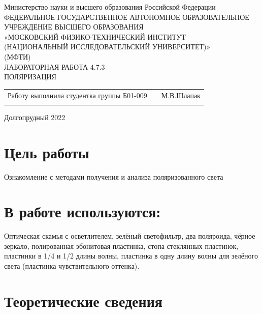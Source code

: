 \documentclass[a4paper]{article}
\begin{document}
 
 \begin{titlepage}
\begin{center}
\hfill \break
Министерство науки и высшего образования Российской Федерации\\
ФЕДЕРАЛЬНОЕ ГОСУДАРСТВЕННОЕ АВТОНОМНОЕ ОБРАЗОВАТЕЛЬНОЕ\\ 
УЧРЕЖДЕНИЕ ВЫСШЕГО ОБРАЗОВАНИЯ\\ 
«МОСКОВСКИЙ ФИЗИКО-ТЕХНИЧЕСКИЙ ИНСТИТУТ\\ 
(НАЦИОНАЛЬНЫЙ ИССЛЕДОВАТЕЛЬСКИЙ УНИВЕРСИТЕТ)»\\
(МФТИ)\\
\hfill \break
\hfill \break
\hfill \break
\hfill \break
\hfill \break
\hfill \break
\hfill \break
\hfill \break
\hfill \break
\hfill \break
\hfill \break
ЛАБОРАТОРНАЯ РАБОТА 4.7.3\\
\hfill \break
ПОЛЯРИЗАЦИЯ\\
\end{center}
\hfill \break
\hfill \break
\hfill \break
\hfill \break
\hfill \break
\hfill \break
\hfill \break
\hfill \break
\hfill \break
\hfill \break
\begin{tabular}{ccc}
Работу выполнила студентка группы Б01-009 & & М.В.Шлапак \\\\
\end{tabular}
\hfill \break
\hfill \break
\hfill \break
\hfill \break
\hfill \break
\hfill \break
\hfill \break
\hfill \break
\begin{center} Долгопрудный 2022 \end{center}
\end{titlepage}
\small
{}
\tableofcontents    
\newpage
\section{Цель работы}
Ознакомление с методами получения и анализа поляризованного света\\
\section{В работе используются:}
Оптическая скамья с осветлителем, зелёный светофильтр, два поляроида, чёрное зеркало, полированная эбонитовая пластинка, стопа стеклянных пластинок, пластинки в 1/4 и 1/2 длины волны, пластинка в одну длину волны для зелёного света (пластинка чувствительного оттенка).
\section{Теоретические сведения}
\end{document}
